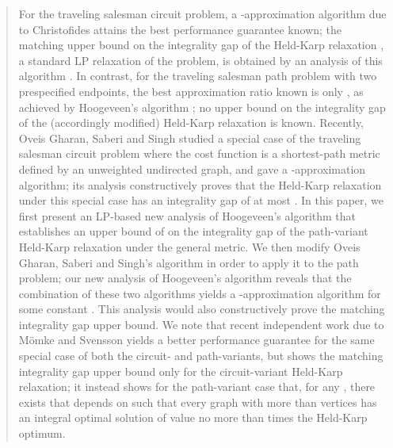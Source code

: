 \documentclass[11pt,letterpaper]{article}
\begin{document}
\begin{quote}
For the traveling salesman circuit problem, a -approximation algorithm due to Christofides \cite{C} attains the best performance guarantee known; the matching upper bound on the integrality gap of the Held-Karp relaxation \cite{HK}, a standard LP relaxation of the problem, is obtained by an analysis of this algorithm \cite{W, SW}. In contrast, for the traveling salesman path problem with two prespecified endpoints, the best approximation ratio known is only , as achieved by Hoogeveen's algorithm \cite{H}; no upper bound on the integrality gap of the (accordingly modified) Held-Karp relaxation is known. Recently, Oveis Gharan, Saberi and Singh \cite{OSS} studied a special case of the traveling salesman circuit problem where the cost function is a shortest-path metric defined by an unweighted undirected graph, and gave a -approximation algorithm; its analysis constructively proves that the Held-Karp relaxation under this special case has an integrality gap of at most . In this paper, we first present an LP-based new analysis of Hoogeveen's algorithm that establishes an upper bound of  on the integrality gap of the path-variant Held-Karp relaxation under the general metric. We then modify Oveis Gharan, Saberi and Singh's algorithm in order to apply it to the path problem; our new analysis of Hoogeveen's algorithm reveals that the combination of these two algorithms yields a -approximation algorithm for some constant . This analysis would also constructively prove the matching integrality gap upper bound. We note that recent independent work due to M\"omke and Svensson \cite{MS} yields a better performance guarantee for the same special case of both the circuit- and path-variants, but shows the matching integrality gap upper bound only for the circuit-variant Held-Karp relaxation; it instead shows for the path-variant case that, for any , there exists  that depends on  such that every graph with more than  vertices has an integral optimal solution of value no more than  times the Held-Karp optimum.


\end{quote}
\end{document}
